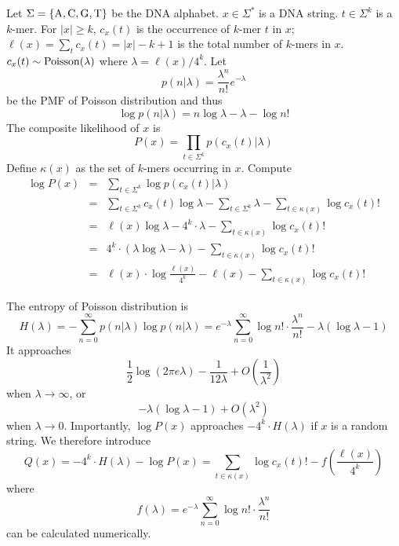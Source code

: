 \documentclass[10pt]{article}
\begin{document}
Let $\Sigma=\{{\rm A},{\rm C},{\rm G},{\rm T}\}$ be the DNA alphabet.
$x\in\Sigma^*$ is a DNA string.
$t\in\Sigma^k$ is a $k$-mer.
For $|x|\ge k$, $c_x(t)$ is the occurrence of $k$-mer $t$ in $x$;
$\ell(x)=\sum_t c_x(t)=|x|-k+1$ is the total number of $k$-mers in $x$.
$c_x(t)\sim{\rm Poisson}(\lambda)$
where $\lambda=\ell(x)/4^k$.
Let
$$
p(n|\lambda)=\frac{\lambda^n}{n!}e^{-\lambda}
$$
be the PMF of Poisson distribution and thus
$$
\log p(n|\lambda)=n\log\lambda-\lambda-\log n!
$$
The composite likelihood of $x$ is
$$
P(x)=\prod_{t\in\Sigma^k}p(c_x(t)|\lambda)
$$
Define $\kappa(x)$ as the set of $k$-mers occurring in $x$.
Compute
\begin{eqnarray*}
\log P(x)&=&\sum_{t\in\Sigma^k}\log p(c_x(t)|\lambda)\\
&=&\sum_{t\in\Sigma^k}c_x(t)\log\lambda-\sum_{t\in\Sigma^k}\lambda-\sum_{t\in\kappa(x)}\log c_x(t)!\\
&=&\ell(x)\log\lambda-4^k\cdot\lambda-\sum_{t\in\kappa(x)}\log c_x(t)!\\
&=&4^k\cdot(\lambda\log\lambda-\lambda)-\sum_{t\in\kappa(x)}\log c_x(t)!\\
&=&\ell(x)\cdot\log\frac{\ell(x)}{4^k}-\ell(x)-\sum_{t\in\kappa(x)}\log c_x(t)!
\end{eqnarray*}


The entropy of Poisson distribution is
$$
H(\lambda)=-\sum_{n=0}^\infty p(n|\lambda)\log p(n|\lambda)
=e^{-\lambda}\sum_{n=0}^\infty\log n!\cdot\frac{\lambda^n}{n!}-\lambda(\log\lambda-1)
$$
It approaches 
$$
\frac{1}{2}\log(2\pi e\lambda)-\frac{1}{12\lambda}+O\left(\frac{1}{\lambda^2}\right)
$$
when $\lambda\to\infty$, or
$$
-\lambda(\log\lambda-1)+O(\lambda^2)
$$
when $\lambda\to0$.
Importantly, $\log P(x)$ approaches $-4^k\cdot H(\lambda)$ if $x$ is a random string.
We therefore introduce
$$
Q(x)=-4^k\cdot H(\lambda)-\log P(x)=\sum_{t\in\kappa(x)}\log c_x(t)!-f\left(\frac{\ell(x)}{4^k}\right)
$$
where
$$
f(\lambda)=e^{-\lambda}\sum_{n=0}^\infty\log n!\cdot\frac{\lambda^n}{n!}
$$
can be calculated numerically.
\end{document}
